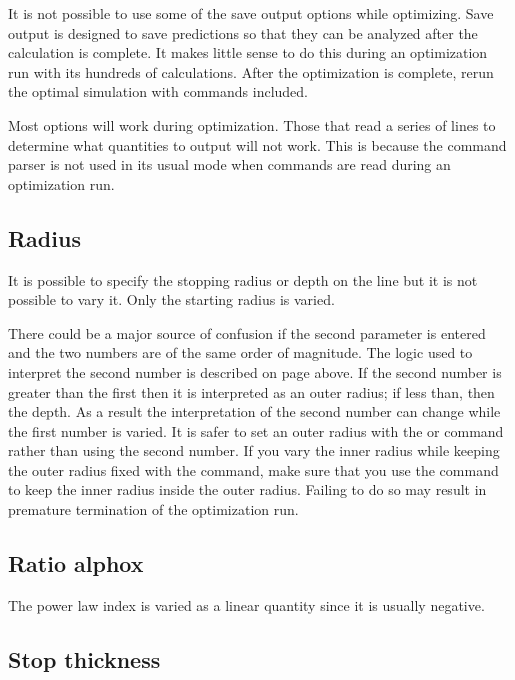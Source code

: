 It is not possible to use some of the save output options while
optimizing.
Save output is designed to save predictions so that they can
be analyzed after the calculation is complete.
It makes little sense to
do this during an optimization run with its hundreds of calculations.  After
the optimization is complete, rerun the optimal simulation with
 commands included.

Most  options will work during optimization.
Those that read a
series of lines to determine what quantities to output will not work.
This is because the command parser is not used in its usual mode
when commands
are read during an optimization run.

\subsection{Radius}
\label{sec:RadiusVaryOptions}

It is possible to specify the stopping radius or depth on the line but
it is not possible to vary it.
Only the starting radius is varied.


There could be a major source of confusion if the second parameter is
entered and the two numbers are of the same order of magnitude.
The logic
used to interpret the second number is described
on page \pageref{sec:RadiusCommand} above.
If the second number is greater than the first then it is interpreted as
an outer radius; if less than, then the depth.
As a result the
interpretation of the second number can change while the first number is
varied.
It is safer to set an outer radius with the
 or  command
rather than using the second number. If you vary the inner radius while
keeping the outer radius fixed with the  command,
make sure that you use the  command to keep the
inner radius inside the outer radius. Failing to do so may result in premature
termination of the optimization run.

\subsection{Ratio alphox}

The power law index is
varied as a linear quantity since it is usually negative.

\subsection{Stop thickness}

